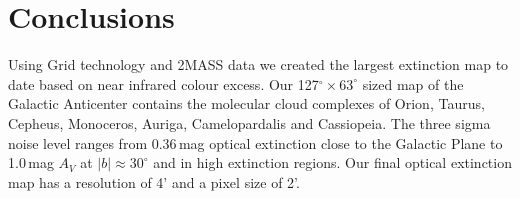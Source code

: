 \documentclass[useAMS,usenatbib]{mn2e}
\begin{document}


\section{Conclusions}
\label{conclusion}

Using Grid technology and 2MASS data we created the largest extinction map to
date based on near infrared colour excess. Our 127$^\circ \times 63^\circ$ sized
map of the Galactic Anticenter contains the molecular cloud complexes of Orion,
Taurus, Cepheus, Monoceros, Auriga, Camelopardalis and Cassiopeia. The three
sigma noise level ranges from 0.36\,mag optical extinction close to the Galactic
Plane to 1.0\,mag $A_V$ at $|b| \approx 30^\circ$ and in high extinction
regions. Our final optical extinction map has a resolution of 4' and a pixel
size of 2'.
\end{document}
